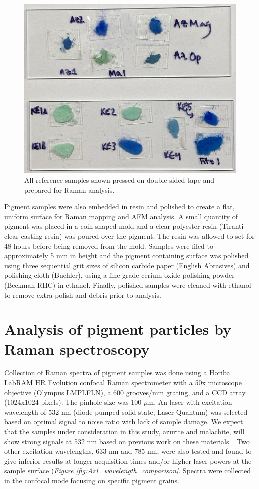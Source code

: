\begin{figure}[H]
\centering
  \includegraphics[width=0.75\linewidth]{sample_slides}
\caption[All reference samples shown pressed on double-sided tape and prepared for Raman analysis.]{All reference samples shown pressed on double-sided tape and prepared for Raman analysis.}
\label{fig:sample_slides}
\end{figure}

Pigment samples were also embedded in resin and polished to create a flat, uniform surface for Raman mapping and AFM analysis. A small quantity of pigment was placed in a coin shaped mold and a clear polyester resin (Tiranti clear casting resin) was poured over the pigment. The resin was allowed to set for 48 hours before being removed from the mold. Samples were filed to approximately 5 mm in height and the pigment containing surface was polished using three sequential grit sizes of silicon carbide paper (English Abrasives) and polishing cloth (Buehler), using a fine grade cerium oxide polishing powder (Beckman-RIIC) in ethanol. Finally, polished samples were cleaned with ethanol to remove extra polish and debris prior to analysis.

\section[Analysis of pigment particles by Raman spectroscopy]{Analysis of pigment particles by Raman spectroscopy}
\label{section2.2}

Collection of Raman spectra of pigment samples was done using a Horiba LabRAM HR Evolution confocal Raman spectrometer with a 50x microscope objective (Olympus LMPLFLN), a 600 grooves/mm grating, and a CCD array (1024x1024 pixels). The pinhole size was 100 $\mu$m. An laser with excitation wavelength of 532 nm (diode-pumped solid-state, Laser Quantum) was selected based on optimal signal to noise ratio with lack of sample damage. We expect that the samples under consideration in this study, azurite and malachite, will show strong signals at 532 nm based on previous work on these materials.~\autocite{Bicchieri} Two other excitation wavelengths, 633 nm and 785 nm, were also tested and found to give inferior results at longer acquisition times and/or higher laser powers at the sample surface (\textit{Figure \ref{fig:Az1_wavelength_comparison}}. Spectra were collected in the confocal mode focusing on specific pigment grains.

